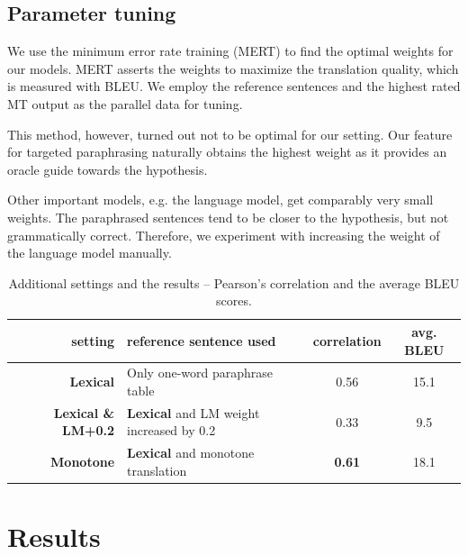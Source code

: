 \subsection{Parameter tuning}
We use the minimum error rate training (MERT) \cite{mert} to find the optimal 
weights for our models. MERT asserts the weights to maximize the translation 
quality, which is measured with BLEU. We employ the reference sentences and the 
highest rated MT output as the parallel data for tuning. 

This method, however, turned out not to be optimal for our setting. Our feature for 
targeted paraphrasing naturally obtains the highest weight as it provides an oracle 
guide towards the hypothesis.

Other important models, e.g. the language model, get comparably very small weights. The 
paraphrased sentences tend to be closer to the hypothesis, but not grammatically correct. 
Therefore, we experiment with increasing the weight of the language model manually. 

\begin{table}[tb]
\begin{center}
\begin{tabular}{r|l|c|c}
\hline
setting & reference sentence used & correlation & avg. BLEU \\
\hline
\textbf{Lexical} &  Only one-word paraphrase table & 0.56 & 15.1 \\
\textbf{Lexical \& LM+0.2}  & \textbf{Lexical} and LM weight increased by 0.2 & 0.33  & 9.5 \\
\textbf{Monotone}  & \textbf{Lexical} and monotone translation & \textbf{0.61} & 18.1 \\
\end{tabular}
\caption{Additional settings and the results -- Pearson's correlation and the average BLEU scores.} 
\label{settings2}
\end{center}
\end{table}



\section{Results}

